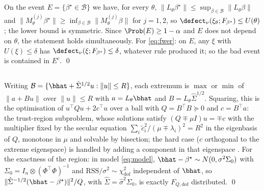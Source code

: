 \subsection*{}
On the event $E = \{\beta^\star \in \mathcal B\}$ we have, for every $\theta$,
$\|L_\theta\beta^\star\| \le \sup_{\beta \in \mathcal B}\|L_\theta\beta\|$ and
$\|M^{(j)}_\theta\beta^\star\| \ge \inf_{\beta\in\mathcal B}
\|M^{(j)}_\theta\beta\|$ for $j = 1,2$, so
$\defect_\nu(\xi_\theta;F_{\beta^\star}) \le U(\theta)$; the lower bound is
symmetric. Since $\Prob(E) \ge 1-\alpha$ and $E$ does not depend on $\theta$,
the statement holds simultaneously. For \eqref{eq:fwer}: on $E$, any $\xi$ with
$U(\xi) \le \delta$ has $\defect_\nu(\xi;F_{\beta^\star}) \le \delta$,
whatever rule produced it; so the bad event is contained in $E^c$. \qed

\subsection*{}
Writing $\mathcal B = \{\bhat + \hat\Sigma^{1/2}u : \|u\|\le R\}$, each
extremum is $\max$ or $\min$ of $\|a + Bu\|$ over $\|u\| \le R$ with
$a = L_\theta\bhat$ and $B = L_\theta\hat\Sigma^{1/2}$. Squaring, this is the
optimisation of $u^{\!\top}Qu + 2c^{\!\top}u$ over a ball with $Q = B^{\!\top}B
\succeq 0$ and $c = B^{\!\top}a$: the trust-region subproblem, whose solutions
satisfy $(Q \mp \mu I)u = \mp c$ with the multiplier fixed by the secular
equation $\sum_i \tilde c_i^2/(\mu \mp \lambda_i)^2 = R^2$ in the eigenbasis of
$Q$, monotone in $\mu$ and solvable by bisection; the hard case ($c$ orthogonal
to the extreme eigenspace) is handled by adding a component in that eigenspace
\citep{gander1989constrained,more1983computing,conn2000trust}. For the exactness
of the region: in model \eqref{eq:model}, $\bhat - \beta^\star \sim
N(0, \sigma^2 \Sigma_0)$ with $\Sigma_0 = I_n \otimes (\Phi^{\!\top}\Phi)^{-1}$
and $\mathrm{RSS}/\sigma^2 \sim \chi^2_{\mathrm{dof}}$ independent of $\bhat$,
so $\|\hat\Sigma^{-1/2}(\bhat-\beta^\star)\|^2/Q$, with
$\hat\Sigma = \hat\sigma^2\Sigma_0$, is exactly $F_{Q,\mathrm{dof}}$
distributed. \qed

